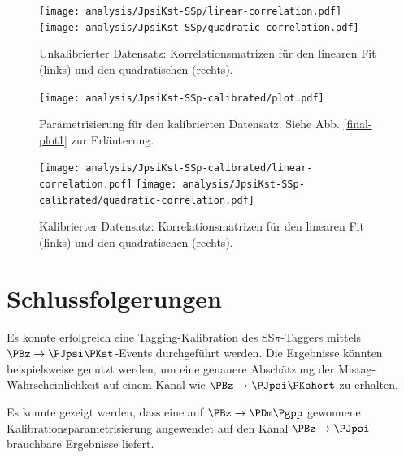 \begin{figure}
  \texttt{[image: analysis/JpsiKst-SSp/linear-correlation.pdf]}
  \texttt{[image: analysis/JpsiKst-SSp/quadratic-correlation.pdf]}
  \caption{Unkalibrierter Datensatz: Korrelationsmatrizen für den linearen Fit (links) und den quadratischen (rechts).}
\end{figure}

\begin{figure}
  \texttt{[image: analysis/JpsiKst-SSp-calibrated/plot.pdf]}
  \caption{Parametrisierung für den kalibrierten Datensatz. Siehe Abb. \ref{final-plot1} zur Erläuterung.}
\end{figure}

\begin{figure}
  \texttt{[image: analysis/JpsiKst-SSp-calibrated/linear-correlation.pdf]}
  \texttt{[image: analysis/JpsiKst-SSp-calibrated/quadratic-correlation.pdf]}
  \caption{Kalibrierter Datensatz: Korrelationsmatrizen für den linearen Fit (links) und den quadratischen (rechts).}
\end{figure}

\section{Schlussfolgerungen}

Es konnte erfolgreich eine Tagging-Kalibration des SS$π$-Taggers mittels $\PBz \to \PJpsi\PKst$-Events durchgeführt werden.
Die Ergebnisse könnten beispielsweise genutzt werden, um eine genauere Abschätzung der Mistag-Wahrscheinlichkeit auf einem Kanal wie $\PBz \to \PJpsi\PKshort$ zu erhalten.

Es konnte gezeigt werden, dass eine auf $\PBz \to \PDm \Pgpp$ gewonnene Kalibrationsparametrisierung angewendet auf den Kanal $\PBz \to \PJpsi$ brauchbare Ergebnisse liefert.

